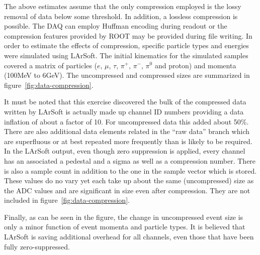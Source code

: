 The above estimates assume that the only compression employed is the
lossy removal of data below some threshold.
In addition, a lossless compression is possible.
The DAQ can employ Huffman encoding during readout or the compression
features provided by ROOT may be provided during file writing.
In order to estimate the effects of compression, specific particle
types and energies were simulated using LArSoft.
The initial kinematics for the simulated samples covered a matrix of
particles ($e$, $\mu$, $\tau$, $\pi^+$, $\pi^-$, $\pi^0$ and proton) and momenta
(100MeV to 6GeV).
The uncompressed and compressed sizes are summarized in figure~\ref{fig:data-compression}.




It must be noted that this exercise discovered the bulk of the
compressed data written by LArSoft is actually made up channel ID
numbers providing a data inflation of about a factor of 10.
For uncompressed data this added about 50\%.
There are also additional data elements related in the ``raw data''
branch which are superfluous or at best repeated more frequently than
is likely to be required.
In the LArSoft output, even though zero suppression is applied, every
channel has an associated a pedestal and a sigma as well as a
compression number.
There is also a sample count in addition to the one in the sample
vector which is stored.
These values do no vary yet each take up about the same (uncompressed)
size as the ADC values and are significant in size even after
compression.
They are not included in figure~\ref{fig:data-compression}.

Finally, as can be seen in the figure, the change in uncompressed
event size is only a minor function of event momenta and particle types.
It is believed that LArSoft is saving additional overhead for all
channels, even those that have been fully zero-suppressed.

